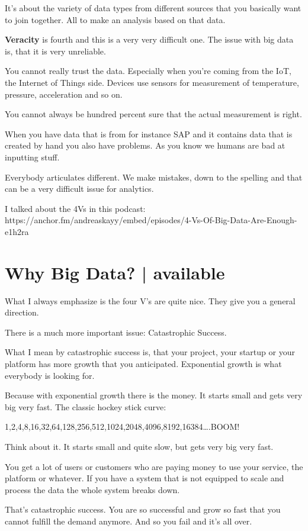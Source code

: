 \documentclass[12pt, numbers=noenddot]{scrreprt} %
\begin{document}
It’s about the variety of data types from different sources that you basically want to join together. All to make an analysis based on that data.

\textbf{Veracity} is fourth and this is a very very difficult one. The issue with big data is, that it is very unreliable.

You cannot really trust the data. Especially when you’re coming from the IoT, the Internet of Things side. Devices use sensors for measurement of temperature, pressure, acceleration and so on.

You cannot always be hundred percent sure that the actual measurement is right.

When you have data that is from for instance SAP and it contains data that is created by hand you also have problems. As you know we humans are bad at inputting stuff.

Everybody articulates different. We make mistakes, down to the spelling and that can be a very difficult issue for analytics.


I talked about the 4Vs in this podcast: https://anchor.fm/andreaskayy/embed/episodes/4-Vs-Of-Big-Data-Are-Enough-e1h2ra

\section{Why Big Data? | available}

What I always emphasize is the four V’s are quite nice. They give you a general direction.

There is a much more important issue: Catastrophic Success.

What I mean by catastrophic success is, that your project, your startup or your platform has more growth that you anticipated. Exponential growth is what everybody is looking for.

Because with exponential growth there is the money. It starts small and gets very big very fast. The classic hockey stick curve:

1,2,4,8,16,32,64,128,256,512,1024,2048,4096,8192,16384….BOOM!

Think about it. It starts small and quite slow, but gets very big very fast.

You get a lot of users or customers who are paying money to use your service, the platform or whatever. If you have a system that is not equipped to scale and process the data the whole system breaks down.

That’s catastrophic success. You are so successful and grow so fast that you cannot fulfill the demand anymore. And so you fail and it’s all over.
\end{document}
